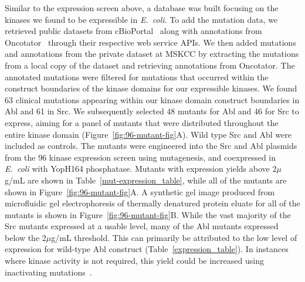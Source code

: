 \documentclass[9pt,lineno]{elife}
\begin{document}
Similar to the expression screen above, a database was built focusing on the kinases we found to be expressible in \emph{E.~coli}. 
To add the mutation data, we retrieved public datasets from cBioPortal~\citep{Cerami:2012eu,Gao:2013kd} along with annotations from Oncotator~\citep{Ramos:2015ew} through their respective web service APIs.
We then added mutations and annotations from the private dataset at MSKCC by extracting the mutations from a local copy of the dataset and retrieving annotations from Oncotator. 
The annotated mutations were filtered for mutations that occurred within the construct boundaries of the kinase domains for our expressible kinases. 
We found 63 clinical mutations appearing within our kinase domain construct boundaries in Abl and 61 in Src. 
We subsequently selected 48 mutants for Abl and 46 for Src to express, aiming for a panel of mutants that were distributed throughout the entire kinase domain (Figure~\ref{fig:96-mutant-fig}A). Wild type Src and Abl were included as controls. 
The mutants were engineered into the Src and Abl plasmids from the 96 kinase expression screen using mutagenesis, and coexpressed in \emph{E.~coli} with YopH164 phosphatase. 
Mutants with expression yields above 2$\mu$g/mL are shown in Table~\ref{mut-expression_table}, while all of the mutants are shown in Figure~\ref{fig:96-mutant-fig}A. 
A synthetic gel image produced from microfluidic gel electrophoresis of thermally denatured protein eluate for all of the mutants is shown in Figure~\ref{fig:96-mutant-fig}B.
While the vast majority of the Src mutants expressed at a usable level, many of the Abl mutants expressed below the 2$\mu$g/mL threshold. 
This can primarily be attributed to the low level of expression for wild-type Abl construct (Table~\ref{expression_table}). 
In instances where kinase activity is not required, this yield could be increased using inactivating mutations~\citep{seeliger:2005:protein-sci:kinase-expression}. 
\end{document}
